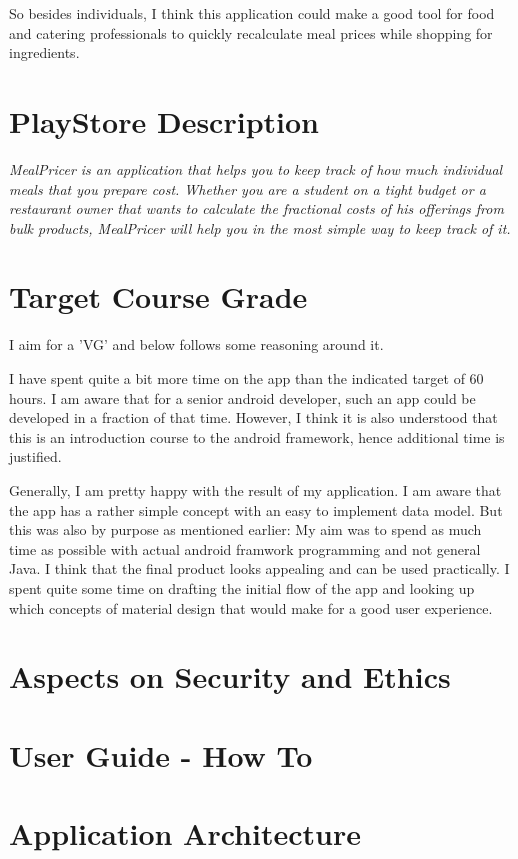 \documentclass[a4paper,11pt,twoside]{article}
\begin{document}
So besides individuals, I think this application could make a good tool for
food and catering professionals to quickly recalculate meal prices while
shopping for ingredients.

\section{PlayStore Description}
\textit{MealPricer is an application that helps you to keep track of how much individual
meals that you prepare cost. Whether you are a student on a tight budget or a
restaurant owner that wants to calculate the fractional costs of his offerings
from bulk products, MealPricer will help you in the most simple way to keep track
of it.}

\section{Target Course Grade}
I aim for a 'VG' and below follows some reasoning around it.

I have spent quite a bit more time on the app than the indicated
target of 60 hours. I am aware that for a senior android developer, such an
app could be developed in a fraction of that time. However, I think it is
also understood that this is an introduction course to the android framework, hence
additional time is justified.

Generally, I am pretty happy with the result of my application. I am aware that
the app has a rather simple concept with an easy to implement data model. But this
was also by purpose as mentioned earlier: My aim was to spend as much time as
possible with actual android framwork programming and not general Java. I think that
the final product looks appealing and can be used practically. I spent quite some
time on drafting the initial flow of the app and looking up which concepts of
material design that would make for a good user experience.



\section{Aspects on Security and Ethics}
\section{User Guide - How To}
\section{Application Architecture}
\end{document}
